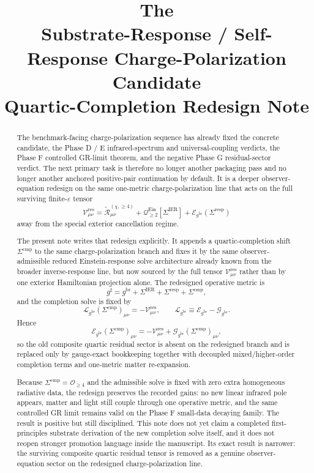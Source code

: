 \documentclass[11pt]{article}
\title{\textbf{The \TheoryName{}}\\[0.4em]
\large Substrate-Response / Self-Response Charge-Polarization Candidate\\
\large Quartic-Completion Redesign Note}
\author{}
\date{}
\newcommand{\ObserverMetric}{g^{\mathrm{br}}}
\newcommand{\CompletedMetric}{g^{\sharp}}
\newcommand{\BaseShift}{\Sigma^{\mathrm{IER}}}
\newcommand{\ResponseShift}{\Sigma^{\mathrm{resp}}}
\newcommand{\CompShift}{\Sigma^{\mathrm{cmp}}}
\newcommand{\ReLongFour}{\widetilde{\mathcal R}_{\mu\nu}^{(\chi,\ge 4)}}
\newcommand{\EinLin}{\mathcal E_{\ObserverMetric}}
\newcommand{\EinQuad}{\mathcal Q_{\ge 2}^{\mathrm{Ein}}}
\newcommand{\GaugeBook}{\mathcal G_{\ObserverMetric}}
\newcommand{\ReducedEin}{\mathcal L_{\ObserverMetric}}
\newcommand{\ResidualCore}{\mathcal V_{\mu\nu}^{\mathrm{res}}}
\newcommand{\epsIR}{\varepsilon}
\begin{document}
\maketitle

\begin{abstract}
The benchmark-facing charge-polarization sequence has already fixed the concrete candidate, the Phase D / E infrared-spectrum and universal-coupling verdicts, the Phase F controlled GR-limit theorem, and the negative Phase G residual-sector verdict. The next primary task is therefore no longer another packaging pass and no longer another anchored positive-pair continuation by default. It is a deeper observer-equation redesign on the same one-metric charge-polarization line that acts on the full surviving finite-\(\epsIR\) tensor
\[
\ResidualCore
=
\ReLongFour
+\EinQuad[\BaseShift]
+\EinLin(\ResponseShift)
\]
away from the special exterior cancellation regime.

The present note writes that redesign explicitly. It appends a quartic-completion shift \(\CompShift\) to the same charge-polarization branch and fixes it by the same observer-admissible reduced Einstein-response solve architecture already known from the broader inverse-response line, but now sourced by the full tensor \(\ResidualCore\) rather than by one exterior Hamiltonian projection alone. The redesigned operative metric is
\[
\CompletedMetric
=
\ObserverMetric+\BaseShift+\ResponseShift+\CompShift,
\]
and the completion solve is fixed by
\[
\ReducedEin(\CompShift)_{\mu\nu}
=
-\ResidualCore,
\qquad
\ReducedEin
\equiv
\EinLin-\GaugeBook.
\]
Hence
\[
\EinLin(\CompShift)_{\mu\nu}
=
-\ResidualCore+\GaugeBook(\CompShift)_{\mu\nu},
\]
so the old composite quartic residual sector is absent on the redesigned branch and is replaced only by gauge-exact bookkeeping together with decoupled mixed/higher-order completion terms and one-metric matter re-expansion.

Because \(\CompShift=\mathcal O_{\ge 4}\) and the admissible solve is fixed with zero extra homogeneous radiative data, the redesign preserves the recorded gains: no new linear infrared pole appears, matter and light still couple through one operative metric, and the same controlled GR limit remains valid on the Phase F small-data decaying family. The result is positive but still disciplined. This note does not yet claim a completed first-principles substrate derivation of the new completion solve itself, and it does not reopen stronger promotion language inside the manuscript. Its exact result is narrower: the surviving composite quartic residual tensor is removed as a genuine observer-equation sector on the redesigned charge-polarization line.
\end{abstract}
\end{document}
